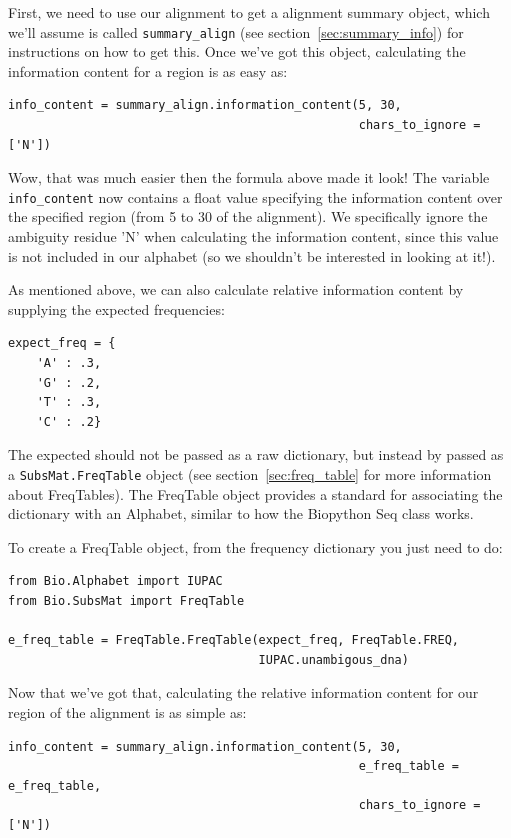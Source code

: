 \documentclass{report}
\begin{document}
First, we need to use our alignment to get a alignment summary object, which we'll assume is called \verb|summary_align| (see section~\ref{sec:summary_info}) for instructions on how to get this. Once we've got this object, calculating the information content for a region is as easy as:

\begin{verbatim}
info_content = summary_align.information_content(5, 30, 
                                                 chars_to_ignore = ['N'])
\end{verbatim}

Wow, that was much easier then the formula above made it look! The variable \verb|info_content| now contains a float value specifying the information content over the specified region (from 5 to 30 of the alignment). We specifically ignore the ambiguity residue 'N' when calculating the information content, since this value is not included in our alphabet (so we shouldn't be interested in looking at it!).


As mentioned above, we can also calculate relative information content by supplying the expected frequencies:

\begin{verbatim}
expect_freq = {
    'A' : .3,
    'G' : .2,
    'T' : .3,
    'C' : .2}
\end{verbatim}

The expected should not be passed as a raw dictionary, but instead by passed as a \verb|SubsMat.FreqTable| object (see section~\ref{sec:freq_table} for more information about FreqTables). The FreqTable object provides a standard for associating the dictionary with an Alphabet, similar to how the Biopython Seq class works. 


To create a FreqTable object, from the frequency dictionary you just need to do:

\begin{verbatim}
from Bio.Alphabet import IUPAC
from Bio.SubsMat import FreqTable

e_freq_table = FreqTable.FreqTable(expect_freq, FreqTable.FREQ,
                                   IUPAC.unambigous_dna)
\end{verbatim}

Now that we've got that, calculating the relative information content for our region of the alignment is as simple as:


\begin{verbatim}
info_content = summary_align.information_content(5, 30,
                                                 e_freq_table = e_freq_table,
                                                 chars_to_ignore = ['N'])
\end{verbatim}
\end{document}
